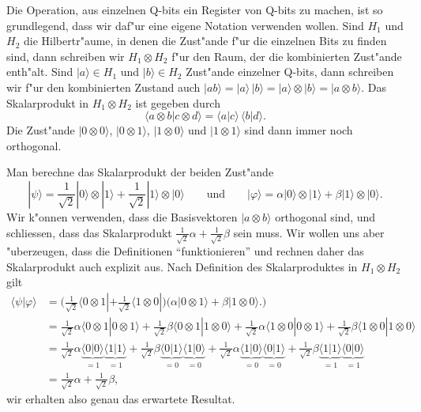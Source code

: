Die Operation, aus einzelnen Q-bits ein Register von Q-bits zu
machen, ist so grundlegend, dass wir daf"ur eine eigene Notation
verwenden wollen.
Sind $H_1$ und $H_2$ die Hilbertr"aume, in denen die Zust"ande f"ur
die einzelnen Bits zu finden sind, dann schreiben wir $H_1\otimes H_2$
f"ur den Raum, der die kombinierten Zust"ande enth"alt.
Sind $|a\rangle\in H_1$ und $|b\rangle\in H_2$ Zust"ande einzelner
Q-bits, dann schreiben wir f"ur den kombinierten Zustand auch
$|ab\rangle=|a\rangle\,|b\rangle=|a\rangle\otimes|b\rangle=|a\otimes b\rangle$.
Das Skalarprodukt in $H_1\otimes H_2$ ist gegeben durch
\[
\langle a\otimes b|c\otimes d\rangle
=
\langle a|c\rangle\,\langle b|d\rangle.
\]
Die Zust"ande $|0\otimes 0\rangle$,
$|0\otimes 1\rangle$,
$|1\otimes 0\rangle$ und
$|1\otimes 1\rangle$ sind dann immer noch orthogonal.

\begin{beispiel}
Man berechne das Skalarprodukt der beiden Zust"ande
\[
|\psi\rangle
=
\frac1{\sqrt{2}} |0\rangle\otimes|1\rangle
+
\frac1{\sqrt{2}} |1\rangle\otimes|0\rangle
\qquad
\text{und}
\qquad
|\varphi\rangle
=
\alpha |0\rangle\otimes|1\rangle
+
\beta |1\rangle\otimes|0\rangle.
\]
Wir k"onnen verwenden, dass die Basisvektoren $|a\otimes b\rangle$ orthogonal
sind, und schliessen, dass das Skalarprodukt
$\frac1{\sqrt{2}}\alpha + \frac1{\sqrt{2}}\beta$ sein muss.
Wir wollen uns aber "uberzeugen, dass die Definitionen ``funktionieren''
und rechnen daher das Skalarprodukt auch explizit aus.
Nach Definition des Skalarproduktes in $H_1\otimes H_2$ gilt
\begin{align*}
\langle\psi|\varphi\rangle
&=
\biggl(
\frac1{\sqrt{2}} \langle 0 \otimes 1|
+
\frac1{\sqrt{2}} \langle 1\otimes0|
\biggr)
\biggl(
\alpha |0\otimes 1\rangle
+
\beta |1\otimes 0\rangle.
\biggr)
\\
&=
\frac1{\sqrt{2}} \alpha\langle 0\otimes 1|0\otimes 1\rangle
+
\frac1{\sqrt{2}} \beta \langle 0\otimes 1|1\otimes 0\rangle
+
\frac1{\sqrt{2}} \alpha\langle 1\otimes 0|0\otimes 1\rangle
+
\frac1{\sqrt{2}} \beta \langle 1\otimes 0|1\otimes 0\rangle
\\
&=
\frac1{\sqrt{2}} \alpha\underbrace{\langle 0|0\rangle}_{=1} \underbrace{\langle 1|1\rangle}_{=1}
+
\frac1{\sqrt{2}} \beta \underbrace{\langle 0|1\rangle}_{=0} \underbrace{\langle 1|0\rangle}_{=0}
+
\frac1{\sqrt{2}} \alpha\underbrace{\langle 1|0\rangle}_{=0} \underbrace{\langle 0|1\rangle}_{=0}
+
\frac1{\sqrt{2}} \beta \underbrace{\langle 1|1\rangle}_{=1} \underbrace{\langle 0|0\rangle}_{=1}
\\
&=
\frac1{\sqrt{2}}\alpha + \frac1{\sqrt{2}}\beta,
\end{align*}
wir erhalten also genau das erwartete Resultat.
\end{beispiel}

